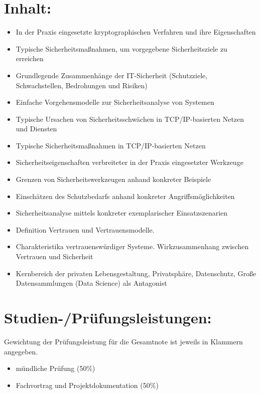 \section*{Inhalt:}\label{inhalt-19}

\begin{itemize}
\tightlist
\item
  In der Praxis eingesetzte kryptographischen Verfahren und ihre
  Eigenschaften
\item
  Typische Sicherheitsmaßnahmen, um vorgegebene Sicherheitsziele zu
  erreichen
\item
  Grundlegende Zusammenhänge der IT-Sicherheit (Schutzziele,
  Schwachstellen, Bedrohungen und Risiken)
\item
  Einfache Vorgehensmodelle zur Sicherheitsanalyse von Systemen
\item
  Typische Ursachen von Sicherheitsschwächen in TCP/IP-basierten Netzen
  und Diensten
\item
  Typische Sicherheitsmaßnahmen in TCP/IP-basierten Netzen
\item
  Sicherheitseigenschaften verbreiteter in der Praxis eingesetzter
  Werkzeuge
\item
  Grenzen von Sicherheitswerkzeugen anhand konkreter Beispiele
\item
  Einschätzen des Schutzbedarfs anhand konkreter Angriffsmöglichkeiten
\item
  Sicherheitsanalyse mittels konkreter exemplarischer Einsatzszenarien
\item
  Definition Vertrauen und Vertrauensmodelle.
\item
  Charakteristika vertrauenswürdiger Systeme. Wirkzusammenhang zwischen
  Vertrauen und Sicherheit
\item
  Kernbereich der privaten Lebensgestaltung, Privatsphäre, Datenschutz,
  Große Datensammlungen (Data Science) als Antagonist
\end{itemize}

\section*{Studien-/Prüfungsleistungen:}\label{studien-pruxfcfungsleistungen-19}

Gewichtung der Prüfungsleistung für die Gesamtnote ist jeweils in
Klammern angegeben.

\begin{itemize}
\tightlist
\item
  mündliche Prüfung (50\%)
\item
  Fachvortrag und Projektdokumentation (50\%)
\end{itemize}

